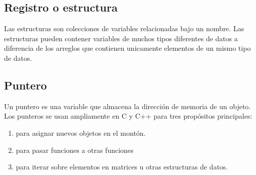 \subsection{Registro o estructura}

Las estructuras son colecciones de variables relacionadas bajo un nombre.
Las estructuras pueden contener variables de muchos tipos diferentes de datos a diferencia de los arreglos que contienen unicamente elementos de un mismo
tipo de datos.

\subsection{Puntero}

Un puntero es una variable que almacena la dirección de memoria de un objeto. Los punteros se usan ampliamente en C y C++ para tres propósitos principales:

\begin{enumerate}
	\item para asignar nuevos objetos en el montón.
	\item para pasar funciones a otras funciones
	\item para iterar sobre elementos en matrices u otras estructuras de datos.
\end{enumerate}
